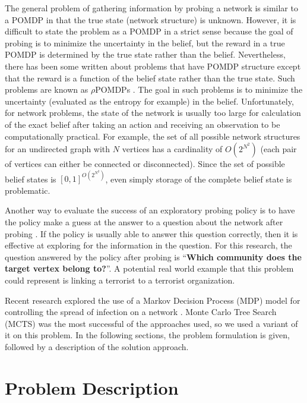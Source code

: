 \documentclass{IEEEtran}
\begin{document}
The general problem of gathering information by probing a network is similar to a POMDP in that the true state (network structure) is unknown. However, it is difficult to state the problem as a POMDP in a strict sense because the goal of probing is to minimize the uncertainty in the belief, but the reward in a true POMDP is determined by the true state rather than the belief. Nevertheless, there has been some written about problems that have POMDP structure except that the reward is a function of the belief state rather than the true state. Such problems are known as $\rho$POMDPs \cite{Araya-Lopez2010}. The goal in such problems is to minimize the uncertainty (evaluated as the entropy for example) in the belief. Unfortunately, for network problems, the state of the network is usually too large for calculation of the exact belief after taking an action and receiving an observation to be computationally practical. For example, the set of all possible network structures for an undirected graph with $N$ vertices has a cardinality of $O\left(2^{N^2}\right)$ (each pair of vertices can either be connected or disconnected). Since the set of possible belief states is $[0,1]^{O\left(2^{N^2}\right)}$, even simply storage of the complete belief state is problematic.

Another way to evaluate the success of an exploratory probing policy is to have the policy make a guess at the answer to a question about the network after probing \cite{Mihaylova2003}. If the policy is usually able to answer this question correctly, then it is effective at exploring for the information in the question. For this research, the question answered by the policy after probing is ``\textbf{Which community does the target vertex belong to?}''. A potential real world example that this problem could represent is linking a terrorist to a terrorist organization.

Recent research explored the use of a Markov Decision Process (MDP) model for controlling the spread of infection on a network \cite{Ho2015}. Monte Carlo Tree Search (MCTS) was the most successful of the approaches used, so we used a variant of it on this problem. In the following sections, the problem formulation is given, followed by a description of the solution approach.


\section{Problem Description}
\end{document}
